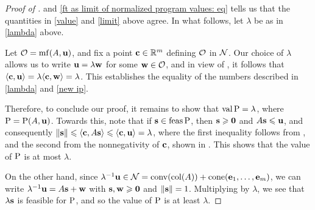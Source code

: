 \documentclass[11pt]{amsart}
\begin{document}
\begin{proof}[Proof of ]
  and \eqref{ft as limit of normalized program values: eq} tells us that the quantities in \eqref{value} and \eqref{limit} above agree.  In what follows, let $\lambda$ be as in \eqref{lambda} above.


    Let $\mathcal{O} = \operatorname{mf}(A,\mathbf{u})$, and fix a point $\mathbf{c} \in \mathbb{R}^m$ defining $\mathcal{O}$ in $\mathcal{N}$.  Our choice of $\lambda$ allows us to write
    $\mathbf{u} = \lambda \mathbf{w}$ for some $\mathbf{w} \in \mathcal{O}$,  and in view of , it follows that $\langle \mathbf{c}, \mathbf{u} \rangle = \lambda \langle \mathbf{c}, \mathbf{w} \rangle = \lambda$.
   This establishes the equality of the numbers described in \eqref{lambda} and \eqref{new ip}.

Therefore, to conclude our proof,  it remains to show that $\operatorname{val} \mathrm{P} = \lambda$, where $\mathrm{P} = \mathrm{P}(A, \mathbf{u})$.  Towards this, note that if $\mathbf{s} \in \operatorname{feas} \mathrm{P}$, then $\mathbf{s}\geqslant \mathbf{0}$ and $A \mathbf{s} \leqslant \mathbf{u}$, and consequently
  $\| \mathbf{s} \| \leqslant \langle \mathbf{c}, A \mathbf{s} \rangle \leqslant \langle \mathbf{c}, \mathbf{u} \rangle = \lambda$,
   where the first inequality follows from , and the second from the nonnegativity of $\mathbf{c}$, shown in .
   This shows that the value of $\mathrm{P}$ is at most $\lambda$. 

   On the other hand, since $\lambda^{-1}\mathbf{u} \in \mathcal{N} = \operatorname{conv}(\operatorname{col}(A)) + \operatorname{cone}(\mathbf{e}_1,\ldots,\mathbf{e}_m)$, we can write $\lambda^{-1}\mathbf{u} = A\mathbf{s}+\mathbf{w}$ with $\mathbf{s}, \mathbf{w} \geqslant \mathbf{0}$ and $\| \mathbf{s} \| = 1$.
   Multiplying by $\lambda$, we see that  $\lambda\mathbf{s}$ is feasible for $\mathrm{P}$, and so the value of $\mathrm{P}$ is at least $\lambda$.
\end{proof}
\end{document}
